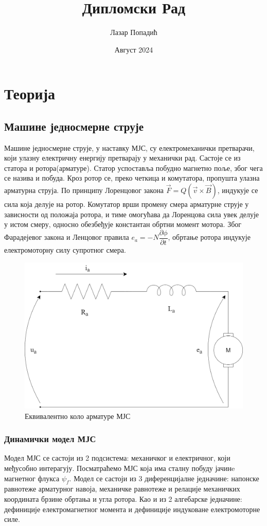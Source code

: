 \documentclass[12pt]{article}
\title{Дипломски Рад}
\author{Лазар Попадић}
\date{Август 2024}
\begin{document}
\section{Теорија}
\subsection{Машине једносмерне струје}
Машине једносмерне струје, у наставку МЈС, су електромеханички претварачи, који улазну електричну енергију претварају у механички рад. Састоје се из статора и ротора(арматуре). Статор успоставља побудно магнетно поље, због чега се назива и побуда. Кроз ротор се, преко четкица и комутатора, пропушта улазна арматурна струја. По принципу Лоренцовог закона $\vec F=Q(\vec v \times \vec B)$, индукује се сила која делује на ротор. Комутатор врши промену смера арматурне струје у зависности од положаја ротора, и тиме омогућава да Лоренцова сила увек делује у истом смеру, односно обезбеђује константан обртни момент мотора. Због Фарадејевог закона и Ленцовог правила $e_a=-N\dfrac{\partial\phi }{\partial t}$, обртање ротора индукује електромоторну силу супротног смера.

\begin{figure}[H]
    \centering
    \includegraphics[width=12cm]{figures/ekv_kolo_armatura.png}
    \caption{Еквивалентно коло арматуре МЈС}
    \label{fig:арматура}
\end{figure}

\subsubsection{Динамички модел МЈС}
Модел МЈС се састоји из 2 подсистема: механичког и електричног, који међусобно интерагују. Посматраћемо МЈС која има сталну побуду јачинe магнетног флукса $\psi _f$. Модел се састоји из 3 диференцијалне једначине: напонске равнотеже арматурног навоја, механичке равнотеже и релације механичких координата брзине обртања и угла ротора. Као и из 2 алгебарске једначине: дефиниције електромагнетног момента и дефиниције индуковане електромоторне силе.
\end{document}

